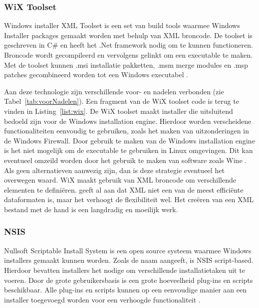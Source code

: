 \subsubsection{WiX Toolset}
Windows installer XML Toolset is een set van build tools waarmee Windows Installer packages gemaakt worden met behulp van XML broncode.
De toolset is geschreven in C\# en heeft het .Net framework nodig om te kunnen functioneren.
Broncode wordt gecompileerd en vervolgens gelinkt om een executable te maken.
Met de toolset kunnen .msi installatie pakketten, .msm merge modules en .msp patches gecombineerd worden tot een Windows executabel \citep{wixToolset}.

Aan deze technologie zijn verschillende voor- en nadelen verbonden (zie Tabel~\ref{tab:voorNadelen}).
Een fragment van de WiX toolset code is terug te vinden in Listing~\ref{list:wix}.
De WiX toolset maakt installer die uitsluitend bedoeld zijn voor de Windows installation engine.
Hierdoor worden verscheidene functionaliteiten eenvoudig te gebruiken, zoals het maken van uitzonderingen in de Windows Firewall.
Door gebruik te maken van de Windows installation engine is het niet mogelijk om de executable te gebruiken in Linux omgevingen. 
Dit kan eventueel omzeild worden door het gebruik te maken van software zoals Wine \citep{amstadt1994wine}. Als geen alternatieven aanwezig zijn, dan is deze strategie eventueel het overwegen waard.
WiX maakt gebruik van XML broncode om verschillende elementen te definiëren.
\citet{xmill} geeft al aan dat XML niet een van de meest efficiënte dataformaten is, maar het verhoogt de flexibiliteit wel.
Het creëren van een XML bestand met de hand is een langdradig en moeilijk werk.

\subsubsection{NSIS}
Nullsoft Scriptable Install System is een open source systeem waarmee Windows installers gemaakt kunnen worden.
Zoals de naam aangeeft, is NSIS script-based.
Hierdoor bevatten installers het nodige om verschillende installatietaken uit te voeren.
Door de grote gebruikersbasis is een grote hoeveelheid plug-ins en scripts beschikbaar.
Alle plug-ins en scripts kunnen op een eenvoudige manier aan een installer toegevoegd worden voor een verhoogde functionaliteit \citep{nsisMain}.

